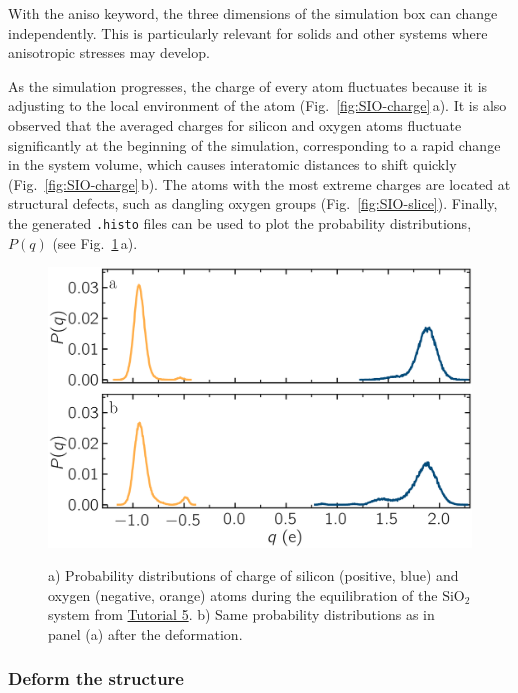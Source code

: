 \documentclass[9pt,tutorial]{livecoms}
\newcommand{\lmpcmd}[1]{\colorbox{listing}{\textcolor{command}{\small{#1}}}} %
\newcommand{\flecmd}[1]{\textcolor{command}{\texttt{#1}}} %
\begin{document}
\begin{note}
  With the \lmpcmd{aniso} keyword, the three dimensions of the simulation
  box can change independently.  This is particularly relevant for solids and other
  systems where anisotropic stresses may develop.
\end{note}

As the simulation progresses, the charge of every atom fluctuates
because it is adjusting to the local environment of the atom (Fig.~\ref{fig:SIO-charge}\,a).
It is also observed that the averaged charges for silicon and oxygen
atoms fluctuate significantly at the beginning of the simulation, corresponding
to a rapid change in the system volume, which causes interatomic distances to
shift quickly (Fig.~\ref{fig:SIO-charge}\,b).  The atoms with the
most extreme charges are located at structural defects,
such as dangling oxygen groups (Fig.~\ref{fig:SIO-slice}).
Finally, the generated \flecmd{.histo} files can be used to
plot the probability distributions, $P(q)$ (see Fig.~\ref{fig:SIO-distribution}\,a).

\begin{figure}
\includegraphics[width=\linewidth]{SIO-distribution}\\[-4ex]
\caption{a) Probability distributions of charge of silicon (positive, blue) and oxygen
(negative, orange) atoms during the equilibration of the $\text{SiO}_2$ system
from \hyperref[reactive-silicon-dioxide-label]{Tutorial 5}.  b) Same probability distributions
as in panel (a) after the deformation.}
\label{fig:SIO-distribution}
\end{figure}

\subsubsection{Deform the structure}
\end{document}
